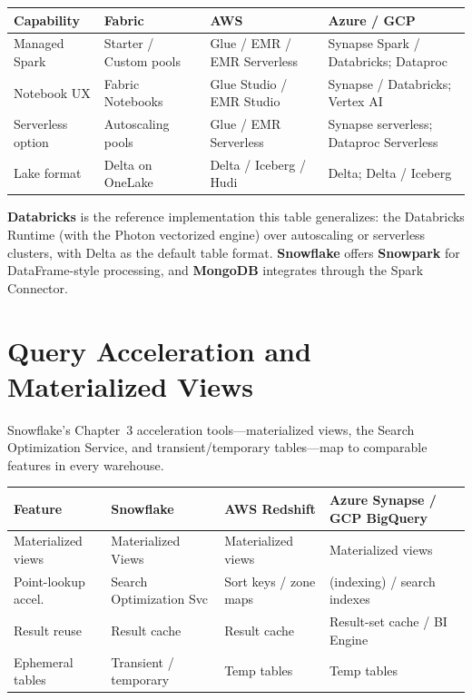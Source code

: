 \begin{center}
\footnotesize
\begin{tabular}{@{}p{2.8cm}p{3.2cm}p{3.2cm}p{3.2cm}@{}}
\toprule
\textbf{Capability} & \textbf{Fabric} & \textbf{AWS} & \textbf{Azure / GCP} \\
\midrule
Managed Spark & Starter / Custom pools & Glue / EMR / EMR Serverless & Synapse Spark / Databricks; Dataproc \\
Notebook UX & Fabric Notebooks & Glue Studio / EMR Studio & Synapse / Databricks; Vertex AI \\
Serverless option & Autoscaling pools & Glue / EMR Serverless & Synapse serverless; Dataproc Serverless \\
Lake format & Delta on OneLake & Delta / Iceberg / Hudi & Delta; Delta / Iceberg \\
\bottomrule
\end{tabular}
\end{center}

\noindent \textbf{Databricks} is the reference implementation this table generalizes: the
Databricks Runtime (with the Photon vectorized engine) over autoscaling or serverless clusters,
with Delta as the default table format. \textbf{Snowflake} offers \textbf{Snowpark} for
DataFrame-style processing, and \textbf{MongoDB} integrates through the Spark Connector.

\section{Query Acceleration and Materialized Views}
%
Snowflake's Chapter~3 acceleration tools---materialized views, the Search Optimization Service, and
transient/temporary tables---map to comparable features in every warehouse.

\begin{center}
\footnotesize
\begin{tabular}{@{}p{2.8cm}p{3.0cm}p{3.0cm}p{3.4cm}@{}}
\toprule
\textbf{Feature} & \textbf{Snowflake} & \textbf{AWS Redshift} & \textbf{Azure Synapse / GCP BigQuery} \\
\midrule
Materialized views & Materialized Views & Materialized views & Materialized views \\
Point-lookup accel. & Search Optimization Svc & Sort keys / zone maps & (indexing) / search indexes \\
Result reuse & Result cache & Result cache & Result-set cache / BI Engine \\
Ephemeral tables & Transient / temporary & Temp tables & Temp tables \\
\bottomrule
\end{tabular}
\end{center}

